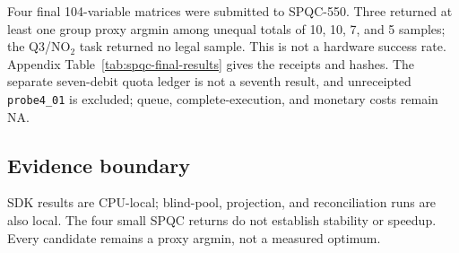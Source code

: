 Four final 104-variable matrices were submitted to SPQC-550.  Three returned
at least one group proxy argmin among unequal totals of 10, 10, 7, and 5
samples; the Q3/$\mathrm{NO}_2$ task returned no legal sample.  This is not
a hardware success rate.  Appendix Table~\ref{tab:spqc-final-results} gives
the receipts and hashes.  The separate seven-debit quota ledger is not a
seventh result, and unreceipted \texttt{probe4\_01} is excluded; queue,
complete-execution, and monetary costs remain NA.

\subsection{Evidence boundary}

SDK results are CPU-local; blind-pool, projection, and reconciliation runs
are also local.  The four small SPQC returns do not establish stability or
speedup.  Every candidate remains a proxy argmin, not a measured optimum.
